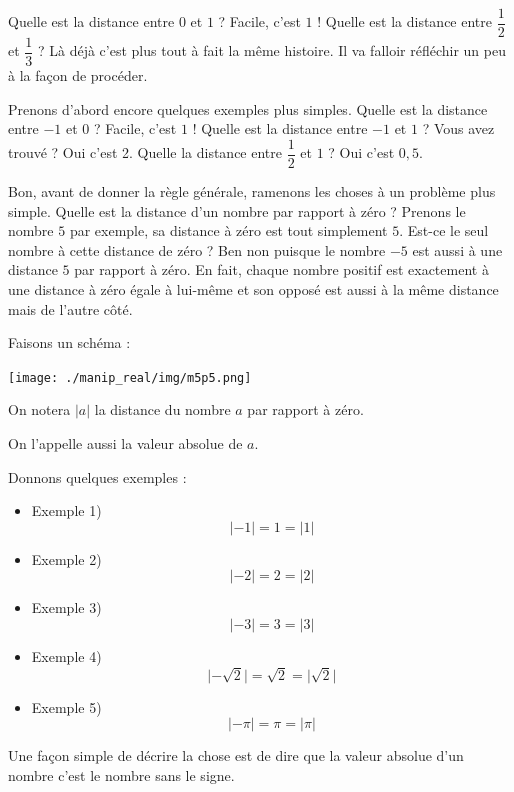 \documentclass[a4paper,11pt]{book}
\begin{document}
Quelle est la \gls{distance} entre \(0\) et \(1\) ?
Facile, c'est \(1\) !
Quelle est la distance entre \(\dfrac{1}{2}\) et \(\dfrac{1}{3}\) ?
Là déjà c'est plus tout à fait la même histoire. Il va falloir
réfléchir un peu à la façon de procéder.

Prenons d'abord encore quelques exemples plus simples.
Quelle est la distance entre \(-1\) et \(0\) ?
Facile, c'est \(1\) !
Quelle est la distance entre \(-1\) et \(1\) ?
Vous avez trouvé ?
Oui c'est 2.
Quelle la distance entre \(\dfrac{1}{2}\) et \(1\) ?
Oui c'est \(0,5\).

Bon, avant de donner la règle générale, ramenons les choses à un
problème plus simple.
Quelle est la distance d'un nombre par rapport à zéro ?
Prenons le nombre \(5\) par exemple, sa distance à zéro est tout
simplement \(5\).
Est-ce le seul nombre à cette distance de zéro ?
Ben non puisque le nombre \(-5\) est aussi à une distance \(5\) par
rapport à zéro.
En fait, chaque nombre positif est exactement à une distance à zéro
égale à lui-même et son opposé est aussi à la même distance mais de
l'autre côté.

Faisons un schéma :

\begin{center}
\texttt{[image: ./manip\_real/img/m5p5.png]}
\end{center}



On notera \(|a|\) la distance du nombre \(a\) par
rapport à zéro.

On l'appelle aussi la valeur absolue de \(a\). 

Donnons quelques exemples :

\begin{itemize}
\item Exemple 1) \[\lvert -1 \rvert = 1 = \lvert 1 \rvert\]
\item Exemple 2) \[\lvert -2 \rvert = 2 = \lvert 2 \rvert\]
\item Exemple 3) \[\lvert -3 \rvert = 3 = \lvert 3 \rvert\]
\item Exemple 4) \[\lvert -\sqrt{2} \rvert = \sqrt{2} = \lvert \sqrt{2} \rvert\]
\item Exemple 5) \[\lvert -\pi \rvert = \pi = \lvert \pi \rvert\]
\end{itemize}


Une façon simple de décrire la chose est de dire que la valeur
absolue d'un nombre c'est le nombre sans le signe.
\end{document}
